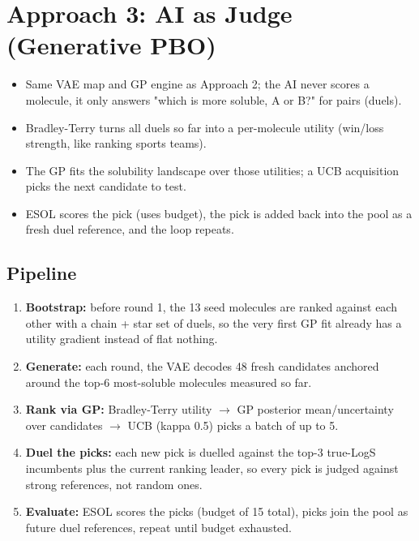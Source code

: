 \section{Approach 3: AI as Judge (Generative PBO)}
\begin{itemize}
    \item Same VAE map and GP engine as Approach 2; the AI never scores a molecule, it only answers "which is more soluble, A or B?" for pairs (duels).
    \item Bradley-Terry turns all duels so far into a per-molecule utility (win/loss strength, like ranking sports teams).
    \item The GP fits the solubility landscape over those utilities; a UCB acquisition picks the next candidate to test.
    \item ESOL scores the pick (uses budget), the pick is added back into the pool as a fresh duel reference, and the loop repeats.
\end{itemize}

\subsection{Pipeline}
\begin{enumerate}
    \item \textbf{Bootstrap:} before round 1, the 13 seed molecules are ranked against each other with a chain + star set of duels, so the very first GP fit already has a utility gradient instead of flat nothing.
    \item \textbf{Generate:} each round, the VAE decodes 48 fresh candidates anchored around the top-6 most-soluble molecules measured so far.
    \item \textbf{Rank via GP:} Bradley-Terry utility $\to$ GP posterior mean/uncertainty over candidates $\to$ UCB (kappa 0.5) picks a batch of up to 5.
    \item \textbf{Duel the picks:} each new pick is duelled against the top-3 true-LogS incumbents plus the current ranking leader, so every pick is judged against strong references, not random ones.
    \item \textbf{Evaluate:} ESOL scores the picks (budget of 15 total), picks join the pool as future duel references, repeat until budget exhausted.
\end{enumerate}


